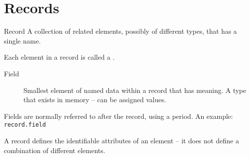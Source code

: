 \documentclass[\main/notes.tex]{subfiles}
\begin{document}
		\section{Records}
			\begin{definition}{Record}
				A collection of related elements, possibly of different types, that has a single name.

				Each element in a record is called a .
				\begin{indentparagraph}
					\begin{description}
						\item[Field] Smallest element of named data within a record that has meaning. A type that exists in memory -- can be assigned values.
					\end{description}

					Fields are normally referred to after the record, using a period. An example: \texttt{record.field}
				\end{indentparagraph}
				A record defines the identifiable attributes of an element -- it does not define a combination of different elements.
			\end{definition}
\end{document}
